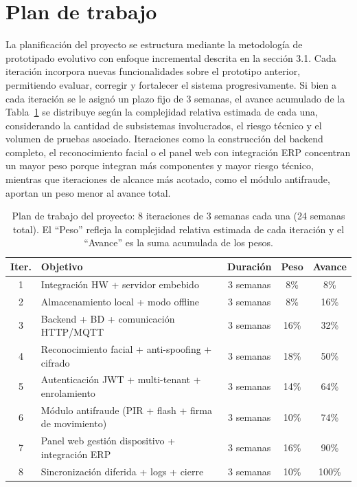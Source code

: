 \documentclass{iccmemoria}
\begin{document}
\section{Plan de trabajo}

La planificación del proyecto se estructura mediante la metodología de prototipado evolutivo con enfoque incremental descrita en la sección 3.1. Cada iteración incorpora nuevas funcionalidades sobre el prototipo anterior, permitiendo evaluar, corregir y fortalecer el sistema progresivamente. Si bien a cada iteración se le asignó un plazo fijo de 3 semanas, el avance acumulado de la Tabla~\ref{tab:plan_trabajo} se distribuye según la complejidad relativa estimada de cada una, considerando la cantidad de subsistemas involucrados, el riesgo técnico y el volumen de pruebas asociado. Iteraciones como la construcción del backend completo, el reconocimiento facial o el panel web con integración ERP concentran un mayor peso porque integran más componentes y mayor riesgo técnico, mientras que iteraciones de alcance más acotado, como el módulo antifraude, aportan un peso menor al avance total.

\begin{table}[H]
\centering
\small
\begin{tabular}{|c|l|c|c|c|}
\hline
\textbf{Iter.} & \textbf{Objetivo} & \textbf{Duración} & \textbf{Peso} & \textbf{Avance} \\
\hline
1 & Integración HW + servidor embebido & 3 semanas & 8\% & 8\% \\
2 & Almacenamiento local + modo offline & 3 semanas & 8\% & 16\% \\
3 & Backend + BD + comunicación HTTP/MQTT & 3 semanas & 16\% & 32\% \\
4 & Reconocimiento facial + anti-spoofing + cifrado & 3 semanas & 18\% & 50\% \\
5 & Autenticación JWT + multi-tenant + enrolamiento & 3 semanas & 14\% & 64\% \\
6 & Módulo antifraude (PIR + flash + firma de movimiento) & 3 semanas & 10\% & 74\% \\
7 & Panel web gestión dispositivo + integración ERP & 3 semanas & 16\% & 90\% \\
8 & Sincronización diferida + logs + cierre & 3 semanas & 10\% & 100\% \\
\hline
\end{tabular}
\caption{Plan de trabajo del proyecto: 8 iteraciones de 3 semanas cada una (24 semanas total). El ``Peso'' refleja la complejidad relativa estimada de cada iteración y el ``Avance'' es la suma acumulada de los pesos.}
\label{tab:plan_trabajo}
\end{table}
\end{document}

